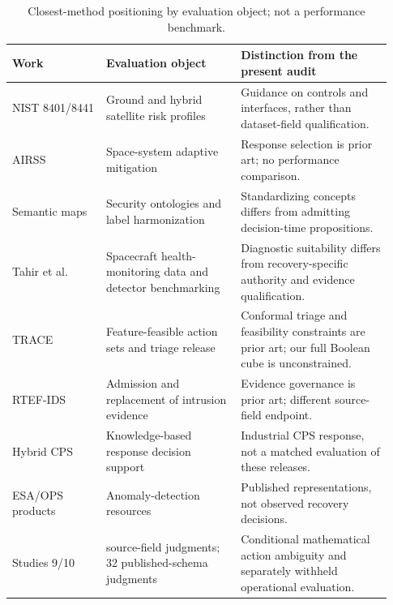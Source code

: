 \documentclass[preprint,12pt]{elsarticle}
\begin{document}
\begin{table}[htbp]
\centering
\small
\setlength{\tabcolsep}{3pt}
\renewcommand{\arraystretch}{1.15}
\caption{Closest-method positioning by evaluation object; not a performance benchmark.}
\label{tab:priorcompare}
\begin{tabular}{@{}>{\raggedright\arraybackslash}p{0.23\linewidth}>{\raggedright\arraybackslash}p{0.33\linewidth}>{\raggedright\arraybackslash}p{0.37\linewidth}@{}}
\toprule
Work & Evaluation object & Distinction from the present audit \\
\midrule
NIST 8401/8441 \cite{nist2022ground,mccarthy2023hsn} & Ground and hybrid satellite risk profiles & Guidance on controls and interfaces, rather than dataset-field qualification. \\
AIRSS \cite{sahakian2021airss} & Space-system adaptive mitigation & Response selection is prior art; no performance comparison. \\
Semantic maps \cite{akbar2023ontology,rodriguez2026harmonization} & Security ontologies and label harmonization & Standardizing concepts differs from admitting decision-time propositions. \\
Tahir et al. \cite{tahir2025benchmark} & Spacecraft health-monitoring data and detector benchmarking & Diagnostic suitability differs from recovery-specific authority and evidence qualification. \\
TRACE \cite{le2026trace} & Feature-feasible action sets and triage release & Conformal triage and feasibility constraints are prior art; our full Boolean cube is unconstrained. \\
RTEF-IDS \cite{li2026rtef} & Admission and replacement of intrusion evidence & Evidence governance is prior art; different source-field endpoint. \\
Hybrid CPS \cite{guarino2026hybrid} & Knowledge-based response decision support & Industrial CPS response, not a matched evaluation of these releases. \\
ESA/OPS products \cite{esaad2025v2,opssat2024v2} & Anomaly-detection resources & Published representations, not observed recovery decisions. \\
Studies 9/10 & 24 source-field judgments; 32 published-schema judgments & Conditional mathematical action ambiguity and separately withheld operational evaluation. \\
\bottomrule
\end{tabular}
\end{table}
\end{document}
